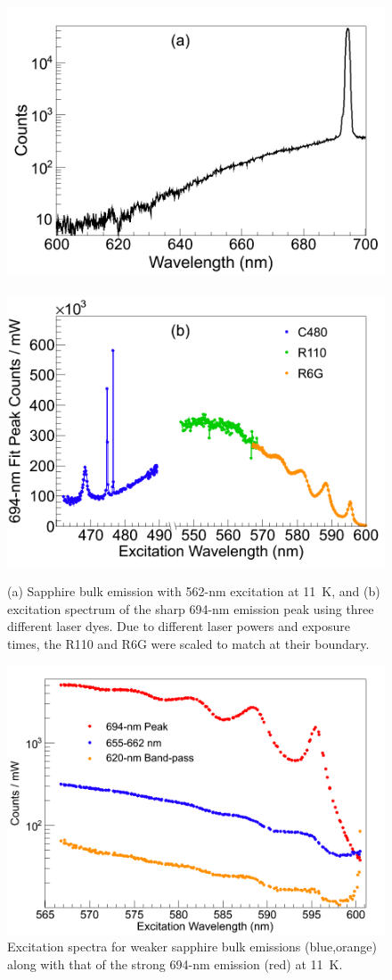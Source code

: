 \begin{figure} %
        \centering
                \includegraphics[width=.5\textwidth]{figures/Cr_a.png}
                ~
                \includegraphics[width=.5\textwidth]{figures/Cr_b.png}
                \caption{(a) Sapphire bulk emission with 562-nm excitation at 11~K, and (b) excitation spectrum of the sharp 694-nm emission peak using three different laser dyes.  Due to different laser powers and exposure times, the R110 and R6G were scaled to match at their boundary.}
\label{fig:Cr}
\end{figure}

\begin{figure} %
        \centering
                \includegraphics[width=.7\textwidth]{figures/Cr_broad.png}
                \caption{Excitation spectra for weaker sapphire bulk emissions (blue,orange) along with that of the strong 694-nm emission (red) at 11~K.}
        \label{fig:CrBroad}
\end{figure}

